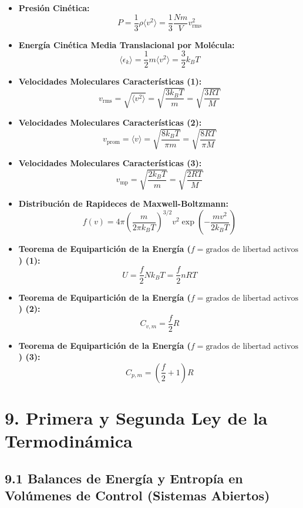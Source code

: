 \documentclass[11pt,a4paper]{article}
\begin{document}
\begin{itemize}
  \item \textbf{Presión Cinética:}
  \[
    P = \frac{1}{3} \rho \langle v^2 \rangle = \frac{1}{3} \frac{N m}{V} v_{\mathrm{rms}}^2
  \]
  \item \textbf{Energía Cinética Media Translacional por Molécula:}
  \[
    \langle \epsilon_k \rangle = \frac{1}{2} m \langle v^2 \rangle = \frac{3}{2} k_B T
  \]
  \item \textbf{Velocidades Moleculares Características (1):}
  \[
    v_{\mathrm{rms}} = \sqrt{\langle v^2 \rangle} = \sqrt{\frac{3 k_B T}{m}} = \sqrt{\frac{3 R T}{M}}
  \]
  \item \textbf{Velocidades Moleculares Características (2):}
  \[
    v_{\text{prom}} = \langle v \rangle = \sqrt{\frac{8 k_B T}{\pi m}} = \sqrt{\frac{8 R T}{\pi M}}
  \]
  \item \textbf{Velocidades Moleculares Características (3):}
  \[
    v_{\mathrm{mp}} = \sqrt{\frac{2 k_B T}{m}} = \sqrt{\frac{2 R T}{M}}
  \]
  \item \textbf{Distribución de Rapideces de Maxwell-Boltzmann:}
  \[
    f(v) = 4\pi \left( \frac{m}{2\pi k_B T} \right)^{3/2} v^2 \exp\left( -\frac{m v^2}{2 k_B T} \right)
  \]
  \item \textbf{Teorema de Equipartición de la Energía ($f = \text{grados de libertad activos}$) (1):}
  \[
    U = \frac{f}{2} N k_B T = \frac{f}{2} n R T
  \]
  \item \textbf{Teorema de Equipartición de la Energía ($f = \text{grados de libertad activos}$) (2):}
  \[
    C_{v,m} = \frac{f}{2} R
  \]
  \item \textbf{Teorema de Equipartición de la Energía ($f = \text{grados de libertad activos}$) (3):}
  \[
    C_{p,m} = \left(\frac{f}{2} + 1\right) R
  \]
\end{itemize}

\section*{9. Primera y Segunda Ley de la Termodinámica}

\subsection*{9.1 Balances de Energía y Entropía en Volúmenes de Control (Sistemas Abiertos)}
\end{document}
